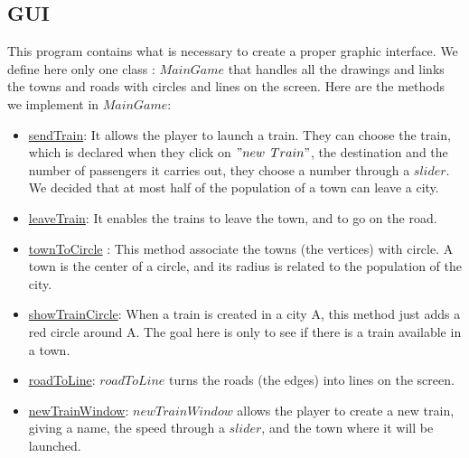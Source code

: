 \documentclass[a4paper]{article}
\begin{document}
	\subsection{GUI}
	This program contains what is necessary to create a proper graphic interface. We define here only one class : $MainGame$ that handles all the drawings and links the towns and roads with circles and lines on the screen.
	Here are the methods we implement in $MainGame$:
	\begin{itemize}
		\item \underline{sendTrain}: It allows the player to launch a train. They can choose the train, which is declared when they click on $"new$ $Train"$, the destination and the number of passengers it carries out, they choose a number through a $slider$. We decided that at most half of the population of a town can leave a city.  
		
		\item \underline{leaveTrain}: It enables the trains to leave the town, and to go on the road.
		
		\item \underline{townToCircle} : This method associate the towns (the vertices) with circle. A town is the center of a circle, and its radius is related to the population of the city. 
		
		\item \underline{showTrainCircle}: When a train is created in a city A, this method just adds a red circle around A. The goal here is only to see if there is a train available in a town.
		
		\item \underline{roadToLine}: $roadToLine$ turns  the roads (the edges) into lines on the screen.
		
		\item \underline{newTrainWindow}: $newTrainWindow$ allows the player to create a new train, giving a name, the speed through a $slider$, and the town where it will be launched.
		
	\end{itemize}
	
\end{document}
